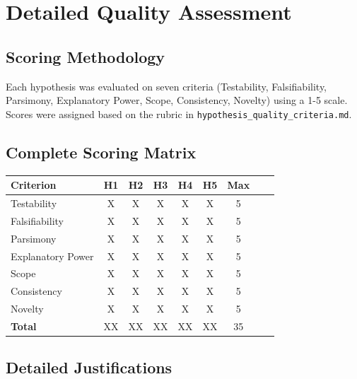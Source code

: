\documentclass[11pt,a4paper]{article}
\begin{document}
\newpage

\appendix
\section{Detailed Quality Assessment}

\subsection*{Scoring Methodology}
Each hypothesis was evaluated on seven criteria (Testability, Falsifiability, Parsimony, Explanatory Power, Scope, Consistency, Novelty) using a 1-5 scale. Scores were assigned based on the rubric in \texttt{hypothesis\_quality\_criteria.md}.

\subsection*{Complete Scoring Matrix}

\begin{center}
\begin{tabular}{lccccccc|c}
\toprule
\textbf{Criterion} & \textbf{H1} & \textbf{H2} & \textbf{H3} & \textbf{H4} & \textbf{H5} & \textbf{Max} \\
\midrule
Testability & X & X & X & X & X & 5 \\
Falsifiability & X & X & X & X & X & 5 \\
Parsimony & X & X & X & X & X & 5 \\
Explanatory Power & X & X & X & X & X & 5 \\
Scope & X & X & X & X & X & 5 \\
Consistency & X & X & X & X & X & 5 \\
Novelty & X & X & X & X & X & 5 \\
\midrule
\textbf{Total} & XX & XX & XX & XX & XX & 35 \\
\bottomrule
\end{tabular}
\end{center}

\subsection*{Detailed Justifications}
\end{document}
